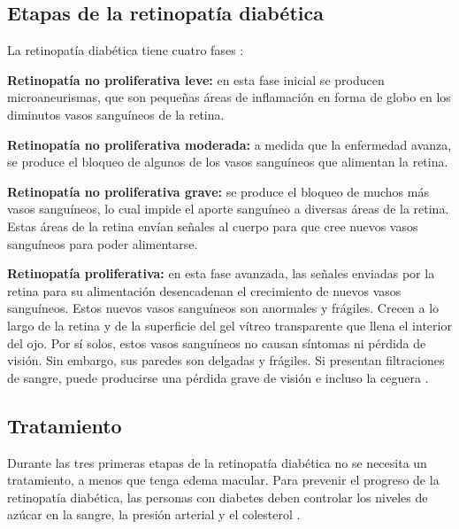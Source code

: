 \subsection{Etapas de la retinopatía diabética}
La retinopatía diabética tiene cuatro fases \cite{diabetica2006pontificia}:

\textbf{Retinopatía no proliferativa leve:} en esta fase inicial se producen microaneurismas, que son pequeñas áreas de inflamación en forma de globo en los diminutos vasos sanguíneos de la retina.

\textbf{Retinopatía no proliferativa moderada:} a medida que la enfermedad avanza, se produce el bloqueo de algunos de los vasos sanguíneos que alimentan la retina.

\textbf{Retinopatía no proliferativa grave:} se produce el bloqueo de muchos más vasos sanguíneos, lo cual impide el aporte sanguíneo a diversas áreas de la retina. Estas áreas de la retina envían señales al cuerpo para que cree nuevos vasos sanguíneos para poder alimentarse.

\textbf{Retinopatía proliferativa:} en esta fase avanzada, las señales enviadas por la retina para su alimentación desencadenan el crecimiento de nuevos vasos sanguíneos. Estos nuevos vasos sanguíneos son anormales y frágiles. Crecen a lo largo de la retina y de la superficie del gel vítreo transparente que llena el interior del ojo. Por sí solos, estos vasos sanguíneos no causan síntomas ni pérdida de visión. Sin embargo, sus paredes son delgadas y frágiles. Si presentan filtraciones de sangre, puede producirse una pérdida grave de visión e incluso la ceguera \cite{optos}.


\subsection{Tratamiento}
Durante las tres primeras etapas de la retinopatía diabética no se necesita un tratamiento, a menos que tenga edema macular. Para prevenir el progreso de la retinopatía diabética, las personas con diabetes deben controlar los niveles de azúcar en la sangre, la presión arterial y el colesterol \cite{retinoUSdep}.


